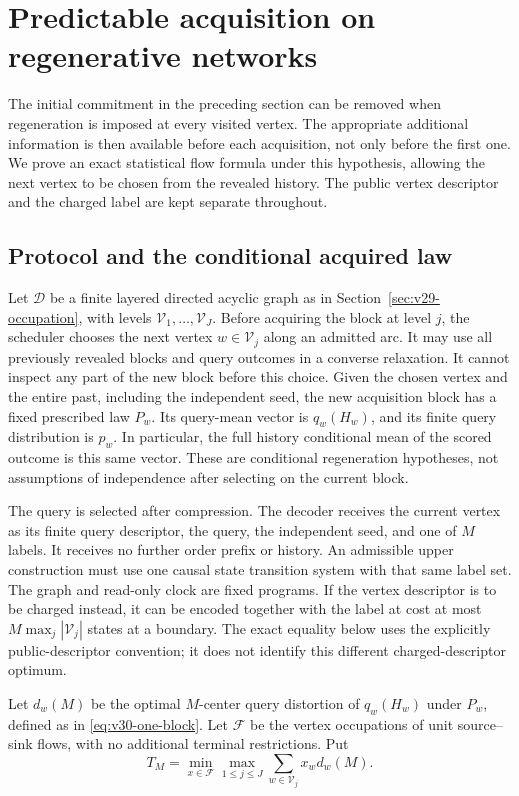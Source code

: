 \section{Predictable acquisition on regenerative networks}
\label{sec:v30-predictable}
The initial commitment in the preceding section can be removed when
regeneration is imposed at every visited vertex. The appropriate
additional information is then available before each acquisition, not
only before the first one. We prove an exact statistical flow formula
under this hypothesis, allowing the next vertex to be chosen from the
revealed history. The public vertex descriptor and the charged label
are kept separate throughout.

\subsection{Protocol and the conditional acquired law}
Let $\mathscr D$ be a finite layered directed acyclic graph as in
Section~\ref{sec:v29-occupation}, with levels
$\mathscr V_1,\ldots,\mathscr V_J$. Before acquiring the block at level
$j$, the scheduler chooses the next vertex $w\in\mathscr V_j$ along
an admitted arc. It may use all previously revealed blocks and query
outcomes in a converse relaxation. It cannot inspect any part of the
new block before this choice. Given the chosen vertex and the entire
past, including the independent seed, the new acquisition block has a
fixed prescribed law $P_w$. Its query-mean vector is $q_w(H_w)$,
and its finite query distribution is $p_w$. In particular, the full
history conditional mean of the scored outcome is this same vector.
These are conditional regeneration hypotheses, not assumptions of
independence after selecting on the current block.

The query is selected after compression. The decoder receives the
current vertex as its finite query descriptor, the query, the independent
seed, and one of $M$ labels. It receives no further order prefix or
history. An admissible upper construction must use one causal state
transition system with that same label set. The graph and read-only
clock are fixed programs. If the vertex descriptor is to be charged
instead, it can be encoded together with the label at cost at most
$M\max_j|\mathscr V_j|$ states at a boundary. The exact equality below
uses the explicitly public-descriptor convention; it does not identify
this different charged-descriptor optimum.

Let $d_w(M)$ be the optimal $M$-center query distortion of $q_w(H_w)$
under $P_w$, defined as in \eqref{eq:v30-one-block}. Let $\mathcal F$
be the vertex occupations of unit source--sink flows, with no additional
terminal restrictions. Put
\begin{equation}\label{eq:v30-predictable-value}
 T_M=\min_{x\in\mathcal F}\max_{1\le j\le J}
                         \sum_{w\in\mathscr V_j}x_w d_w(M).
\end{equation}

